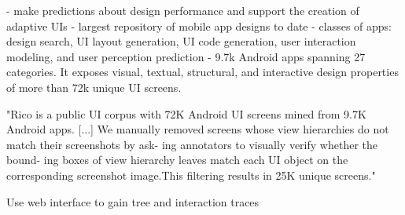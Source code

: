- make predictions about design performance and support the creation of adaptive UIs
- largest repository of mobile app designs to date
- classes of apps: design search, UI layout generation, UI code generation, user interaction modeling, and user perception prediction
- 9.7k Android apps spanning 27 categories. It exposes visual, textual, structural, and interactive design properties of more than 72k unique UI screens.


"Rico is a public UI corpus with 72K Android UI
screens mined from 9.7K Android apps. [...]
We manually removed screens whose view
hierarchies do not match their screenshots by ask-
ing annotators to visually verify whether the bound-
ing boxes of view hierarchy leaves match each UI
object on the corresponding screenshot image.This filtering results in 25K unique screens."



Use web interface to gain tree and interaction traces

